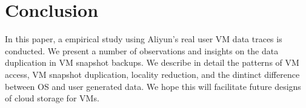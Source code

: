 \section{Conclusion}
In this paper, a empirical study using Aliyun's real user VM data traces is conducted. 
We present a number of observations and insights on the data duplication
in VM snapshot backups. We describe
in detail the patterns of VM access, VM snapshot duplication, locality reduction, and
the dintinct difference between OS and user generated data.
We hope this will facilitate future designs of cloud storage for VMs.